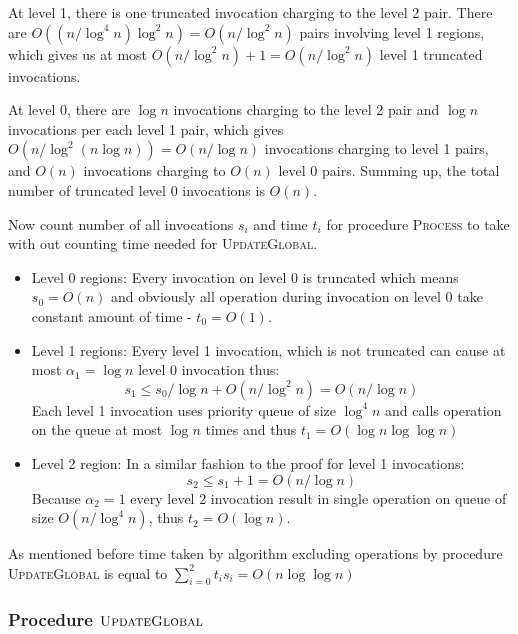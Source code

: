 At level 1, there is one truncated invocation charging to the level 2 pair. There are $O((n/\log^4n)\log^2 n) = O(n/\log^2 n)$ pairs involving level 1 regions, which gives us at most $O(n/\log^2 n) + 1 = O(n/\log^2 n)$ level 1 truncated invocations.

At level 0, there are $\log n$ invocations charging to the level 2 pair and $\log n$ invocations per each level 1 pair, which gives $O(n/\log^2 (n\log n)) = O(n/\log n)$ invocations charging to level 1 pairs, and $O(n)$ invocations charging to $O(n)$ level 0 pairs. Summing up, the total number of truncated level 0 invocations is $O(n)$.

Now count number of all invocations $s_i$ and time $t_i$ for procedure \textsc{Process} to take with out counting time needed for \textsc{UpdateGlobal}.
\begin{itemize}
    \item Level 0 regions: Every invocation on level 0 is truncated which means $s_0 = O(n)$ and obviously all operation during invocation on level 0 take constant amount of time - $t_0 = O(1)$.
\item Level 1 regions:
Every level 1 invocation, which is not truncated can cause at most $\alpha_1 = \log n$ level 0 invocation thus:
$$ s_1 \leq s_0/\log n + O(n/ \log^2n) = O(n/\log n) $$
Each level 1 invocation uses priority queue of size $\log^4 n$ and calls operation on the queue at most $\log n$ times and thus $t_1 = O(\log n \log\log n)$
\item Level 2 region:
In a similar fashion to the proof for level 1 invocations:
$$ s_2 \leq s_1 + 1 = O(n/\log n)$$
Because $\alpha_2 = 1$ every level 2 invocation result in single operation on queue of size $O(n/\log^4 n)$, thus $t_2 = O(\log n)$.
\end{itemize}

As mentioned before time taken by algorithm excluding operations by procedure \textsc{UpdateGlobal} is equal to $\sum_{i=0}^2 t_i s_i = O(n \log \log n)$

\subsubsection{Procedure $\textsc{UpdateGlobal}$}

